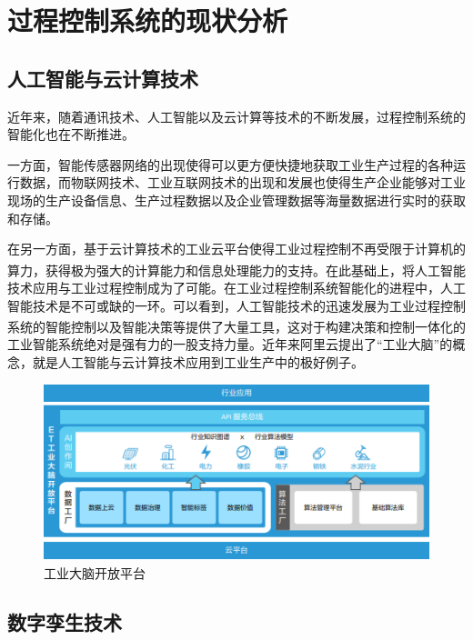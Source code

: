 \documentclass{my_class}
\begin{document}
%
\section{过程控制系统的现状分析}

\subsection{人工智能与云计算技术}

近年来，随着通讯技术、人工智能以及云计算等技术的不断发展，过程控制系统的智能化也在不断推进。

一方面，智能传感器网络的出现使得可以更方便快捷地获取工业生产过程的各种运行数据，而物联网技术、工业互联网技术的出现和发展也使得生产企业能够对工业现场的生产设备信息、生产过程数据以及企业管理数据等海量数据进行实时的获取和存储。

在另一方面，基于云计算技术的工业云平台使得工业过程控制不再受限于计算机的算力，获得极为强大的计算能力和信息处理能力的支持\textsuperscript{\cite{ZGZZ2022S1004}}。在此基础上，将人工智能技术应用与工业过程控制成为了可能。在工业过程控制系统智能化的进程中，人工智能技术是不可或缺的一环。可以看到，人工智能技术的迅速发展为工业过程控制系统的智能控制以及智能决策等提供了大量工具\textsuperscript{\cite{MOTO202010002}}，这对于构建决策和控制一体化的工业智能系统绝对是强有力的一股支持力量。近年来阿里云提出了“工业大脑”的概念，就是人工智能与云计算技术应用到工业生产中的极好例子。

\begin{figure}[H]
    \centering %
    \includegraphics[width=.8\textwidth]{figure/工业大脑开放平台.png} 
    \caption{工业大脑开放平台} %
\end{figure}


\subsection{数字孪生技术}
\end{document}
